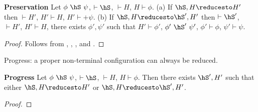 \begin{Theorem}{\textbf{Preservation}}
\label{Theorem:Preservation}
Let $\phi~\hS~\psi$, $\vdash \hS$, $\vdash H$, $H \vdash \phi$.
(a) If $\hS,H \reducesto H'$ then $\vdash H'$, $H' \vdash H$, $H' \vdash +\psi$.
(b) If $\hS,H \reducesto \hS',H'$ then $\vdash \hS'$, $\vdash H'$, $H' \vdash H$,
there exists $\phi',\psi'$ such
that $H' \vdash \phi'$, $\phi'~\hS'~\psi'$, $\phi' \vdash \phi$, $\psi' \vdash \psi$.
\end{Theorem}
\begin{proof}
Follows from ,  , ,
    and .
\end{proof}

Progress: a proper non-terminal configuration can always be reduced.
\begin{Theorem}{\textbf{Progress}}
Let $\phi~\hS~\psi$, $\vdash \hS$, $\vdash H$, $H \vdash \phi$.
Then there exists $\hS',H'$ such
    that either $\hS,H \reducesto H'$ or $\hS,H \reducesto \hS',H'$.
\end{Theorem}
\begin{proof}
\end{proof}
